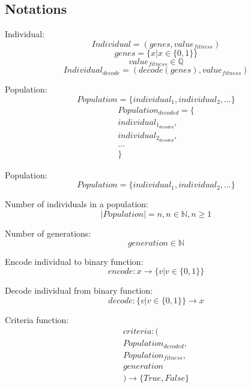 \documentclass[conference]{IEEEtran}
\begin{document}
\subsection{Notations}
Individual:
\begin{equation} Individual = (genes, value_{fitness}) \end{equation}
\begin{equation} genes = \{x | x \in \{0, 1\}\} \end{equation}
\begin{equation} value_{fitness} \in \mathbb{Q} \end{equation}
\begin{equation} Individual_{decode} = (decode(genes), value_{fitness}) \end{equation}

Population:
\begin{equation} Population = \{individual_1, individual_2, \dots\} \end{equation}
\begin{multline} Population_{decoded} = \{\\individual_{1_{decoded}},\\individual_{2_{decoded}},\\\dots\\\} \end{multline}

Population:
\begin{equation} Population = \{individual_1, individual_2, \dots\} \end{equation}

Number of individuals in a population:
\begin{equation} |Population| = n, n \in \mathbb{N}, n \geq 1 \end{equation}

Number of generations:
\begin{equation} generation \in \mathbb{N} \end{equation}

Encode individual to binary function:
\begin{equation} encode : x \rightarrow \{v | v \in \{0, 1\}\} \end{equation}

Decode individual from binary function:
\begin{equation} decode : \{v | v \in \{0, 1\}\} \rightarrow x \end{equation}

Criteria function:
\begin{multline} criteria : (\\Population_{decoded},\\ Population_{fitness}, \\generation\\) \rightarrow \{True, False\} \end{multline}
\end{document}
